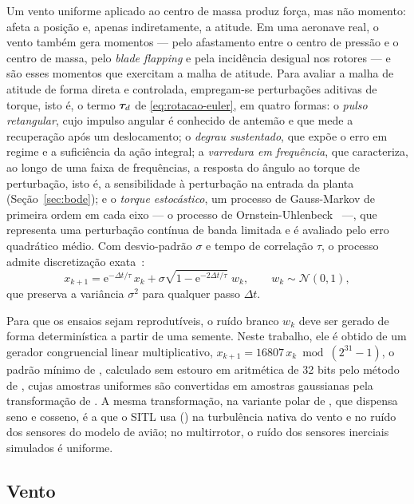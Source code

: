 Um vento uniforme aplicado ao centro de massa produz força, mas não momento:
afeta a posição e, apenas indiretamente, a atitude. Em uma aeronave real, o
vento também gera momentos --- pelo afastamento entre o centro de pressão e o
centro de massa, pelo \textit{blade flapping} e pela incidência desigual nos
rotores --- e são esses momentos que exercitam a malha de atitude. Para
avaliar a malha de atitude de forma direta e controlada, empregam-se
perturbações aditivas de torque, isto é, o termo $\bm{\tau}_d$ de
\eqref{eq:rotacao-euler}, em quatro formas: o \emph{pulso retangular}, cujo
impulso angular é conhecido de antemão e que mede a recuperação após um
deslocamento; o \emph{degrau sustentado}, que expõe o erro em regime e a
suficiência da ação integral; a \emph{varredura em frequência}, que
caracteriza, ao longo de uma faixa de frequências, a resposta do ângulo ao
torque de perturbação, isto é, a sensibilidade à perturbação na entrada da
planta (Seção~\ref{sec:bode}); e o \emph{torque estocástico}, um processo de
Gauss-Markov de primeira ordem em cada eixo --- o processo de
Ornstein-Uhlenbeck~\cite{uhlenbeck1930} ---, que representa uma perturbação
contínua de banda limitada e é avaliado pelo erro quadrático médio. Com
desvio-padrão $\sigma$ e tempo de correlação $\tau$, o processo admite
discretização exata~\cite{gillespie1996}:
\begin{equation}
x_{k+1} = \mathrm{e}^{-\Delta t/\tau}\,x_k
        + \sigma\sqrt{1 - \mathrm{e}^{-2\Delta t/\tau}}\;w_k,
\qquad w_k \sim \mathcal{N}(0,1),
\label{eq:gauss-markov-discreto}
\end{equation}
que preserva a variância $\sigma^2$ para qualquer passo $\Delta t$.

Para que os ensaios sejam reprodutíveis, o ruído branco $w_k$ deve ser gerado
de forma determinística a partir de uma semente. Neste trabalho, ele é
obtido de um gerador congruencial linear multiplicativo,
$x_{k+1} = 16807\,x_k \bmod (2^{31}-1)$, o padrão mínimo de
, calculado sem estouro em aritmética de 32 bits pelo
método de , cujas amostras uniformes são convertidas em amostras
gaussianas pela transformação de . A mesma transformação,
na variante polar de , que dispensa seno e cosseno,
é a que o SITL usa () na turbulência nativa do
vento e no ruído dos sensores do modelo de avião; no multirrotor, o ruído dos
sensores inerciais simulados é uniforme.

\subsection{Vento}

